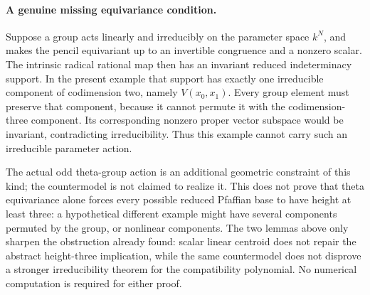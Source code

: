 \paragraph{A genuine missing equivariance condition.}
Suppose a group acts linearly and irreducibly on the parameter
space \(k^N\), and makes the pencil equivariant up to an invertible
congruence and a nonzero scalar.  The intrinsic radical rational
map then has an invariant reduced indeterminacy support.
In the present example that support has exactly one irreducible
component of codimension two, namely \(V(x_0,x_1)\).
Every group element must preserve that component, because it
cannot permute it with the codimension-three component.
Its corresponding nonzero proper vector subspace would be
invariant, contradicting irreducibility.  Thus this example
cannot carry such an irreducible parameter action.

The actual odd theta-group action is an additional geometric
constraint of this kind; the countermodel is not claimed to
realize it.  This does not prove that theta equivariance alone
forces every possible reduced Pfaffian base to have height at
least three: a hypothetical different example might have
several components permuted by the group, or nonlinear components.
The two lemmas above only sharpen the obstruction already found:
scalar linear centroid does not repair the abstract height-three
implication, while the same countermodel does not disprove a
stronger irreducibility theorem for the compatibility polynomial.
No numerical computation is required for either proof.
